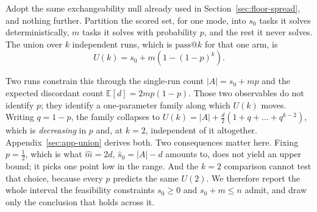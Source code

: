 Adopt the same exchangeability null already used in
Section~\ref{sec:floor-spread}, and nothing further. Partition the scored set, for one mode, into $s_0$ tasks it solves deterministically, $m$ tasks it
solves with probability $p$, and the rest it never solves. The union over $k$
independent runs, which is $\mathrm{pass}@k$ for that one arm, is
\begin{equation}
  U(k) = s_0 + m\left(1 - (1-p)^{k}\right).
  \label{eq:union}
\end{equation}

Two runs constrain this through the single-run count $|A| = s_0 + mp$ and the
expected discordant count $\mathbb{E}[d] = 2mp(1-p)$. Those two observables do
not identify $p$; they identify a one-parameter family along which $U(k)$
moves. Writing $q = 1-p$, the family collapses to
$U(k) = |A| + \tfrac{d}{2}\left(1 + q + \dots + q^{k-2}\right)$, which is
\emph{decreasing} in $p$ and, at $k=2$, independent of it altogether.
Appendix~\ref{sec:app-union} derives both. Two consequences matter here. Fixing
$p=\tfrac12$, which is what $\hat m = 2d$, $\hat s_0 = |A|-d$ amounts to,
does not yield an upper bound; it picks one point low in the range. And the
$k=2$ comparison cannot test that choice, because every $p$ predicts the same
$U(2)$. We therefore report the whole interval the feasibility constraints
$s_0 \ge 0$ and $s_0 + m \le n$ admit, and draw only the conclusion that holds
across it.

